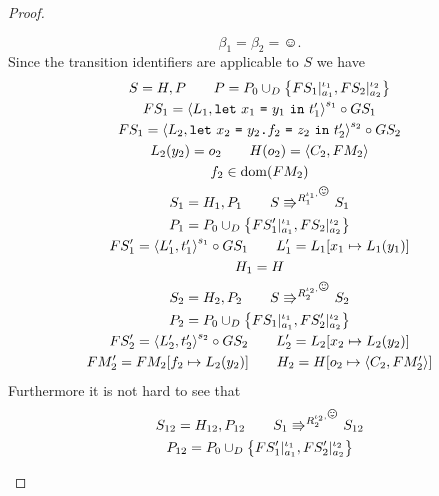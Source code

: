 \begin{proof}
\begin{description}
      \begin{equation*}
        \beta_1 = \beta_2 = \smiley.
      \end{equation*}
      Since the transition identifiers are applicable to $S$ we have
      \begin{equation}
        \begin{gathered}
          S = H, P \andalso P = P_0 \cup_D \left\{ FS_1|_{a_1}^{\iota_1},
          FS_2|_{a_2}^{\iota_2} \right\} \\
          FS_1 = \xframe{L_1, \Let{x_1}{y_1}{t'_1}}^{s_1} \circ GS_1
          \\ 
          FS_1 = \xframe{L_2, \Let{x_2}{\FAss{y_2}{f_2}{z_2}}{t'_2}}^{s_2}
          \circ GS_2 \\
          L_2(y_2) = o_2 \andalso H(o_2) = \Obj{C_2, FM_2} \\
          f_2 \in \dom(FM_2) \\
          S_1 = H_1, P_1 \andalso S \Rrightarrow^{R_1^{\iota_1, \smiley}} S_1
          \\
          P_1 = P_0 \cup_D \left\{ FS'_1|_{a_1}^{\iota_1},
          FS_2|_{a_2}^{\iota_2} \right\} \\
          FS'_1 = \xframe{L'_1, t'_1}^{s_1} \circ GS_1  \andalso L'_1 = L_1[x_1 \mapsto
          L_1(y_1)] \\
          H_1 = H
          \\
          S_2 = H_2, P_2 \andalso S \Rrightarrow^{R_2^{\iota_2, \smiley}} S_2
          \\
          P_2 = P_0 \cup_D \left\{ FS_1|_{a_1}^{\iota_1},
          FS'_2|_{a_2}^{\iota_2} \right\} \\
          FS'_2 = \xframe{L'_2, t'_2}^{s_2} \circ GS_2  \andalso L'_2 = L_2[x_2 \mapsto
          L_2(y_2)] \\
          FM'_2 = FM_2[f_2 \mapsto L_2(y_2)] \andalso H_2 = H[o_2 \mapsto
          \Obj{C_2, FM'_2}]
          \\
        \end{gathered}
      \end{equation}
      Furthermore it is not hard to see that 
      \begin{equation}
        \begin{gathered}
          S_{12} = H_{12}, P_{12} \andalso S_1 \Rrightarrow^{R_2^{\iota_2,
          \smiley}} S_{12}
          \\
          P_{12} = P_0 \cup_D \left\{ FS'_1|_{a_1}^{\iota_1},
          FS'_2|_{a_2}^{\iota_2} \right\} \\

\end{gathered}
\end{equation}
\end{description}
\end{proof}
